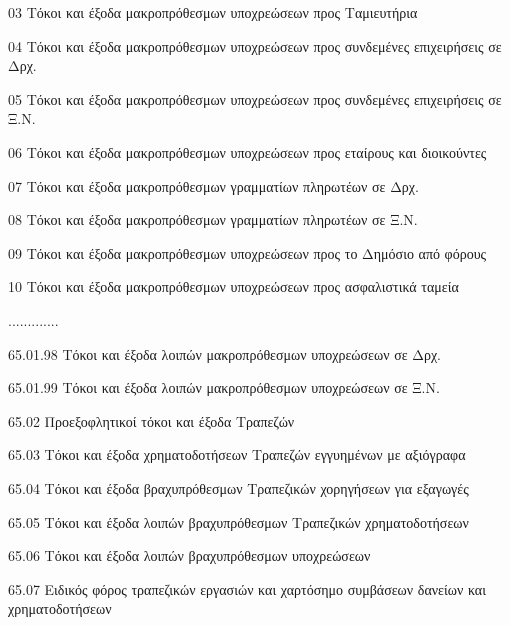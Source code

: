 \documentclass[A4,10pt,greek]{book}
\begin{document}
                               03   Τόκοι και έξοδα μακροπρόθεσμων υποχρεώσεων
                                       προς Ταμιευτήρια

                               04   Τόκοι και έξοδα μακροπρόθεσμων υποχρεώσεων
                                       προς συνδεμένες επιχειρήσεις σε Δρχ.

                               05   Τόκοι και έξοδα μακροπρόθεσμων υποχρεώσεων προς
                                       συνδεμένες επιχειρήσεις σε Ξ.Ν.

                               06   Τόκοι και έξοδα μακροπρόθεσμων υποχρεώσεων προς
                                       εταίρους και διοικούντες

                               07   Τόκοι και έξοδα μακροπρόθεσμων γραμματίων
                                       πληρωτέων σε Δρχ.

                               08   Τόκοι και έξοδα μακροπρόθεσμων γραμματίων
                                       πληρωτέων σε Ξ.Ν.

                               09   Τόκοι και έξοδα μακροπρόθεσμων υποχρεώσεων
                                       προς το Δημόσιο από φόρους

                               10   Τόκοι και έξοδα μακροπρόθεσμων υποχρεώσεων
                                       προς ασφαλιστικά ταμεία

                     .............

                    65.01.98    Τόκοι και έξοδα λοιπών μακροπρόθεσμων
                                       υποχρεώσεων σε Δρχ.

                    65.01.99   Τόκοι και έξοδα λοιπών μακροπρόθεσμων
                                       υποχρεώσεων σε Ξ.Ν.

        65.02   Προεξοφλητικοί τόκοι και έξοδα Τραπεζών

        65.03   Τόκοι και έξοδα χρηματοδοτήσεων Τραπεζών
                     εγγυημένων με αξιόγραφα

        65.04   Τόκοι και έξοδα βραχυπρόθεσμων Τραπεζικών χορηγήσεων
                     για εξαγωγές

        65.05   Τόκοι και έξοδα λοιπών βραχυπρόθεσμων Τραπεζικών
                     χρηματοδοτήσεων

        65.06   Τόκοι και έξοδα λοιπών βραχυπρόθεσμων υποχρεώσεων

        65.07   Ειδικός φόρος τραπεζικών εργασιών και χαρτόσημο συμβάσεων
                     δανείων και χρηματοδοτήσεων
\end{document}
